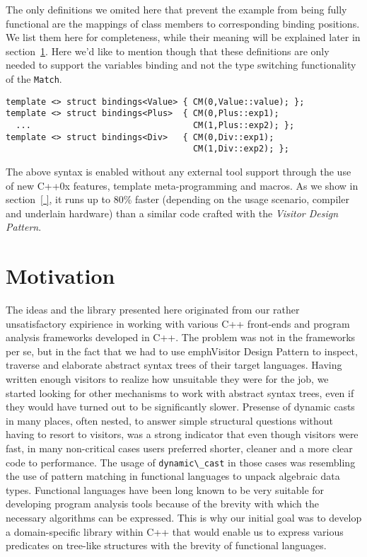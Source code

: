 \documentclass[preprint]{sigplanconf}
\DeclareRobustCommand{\code}[1]{{\lstinline[breaklines=false]{#1}}}
\begin{document}
The only definitions we omited here that prevent the example from being fully 
functional are the mappings of class members to corresponding binding positions. 
We list them here for completeness, while their meaning will be explained later 
in section~\ref{}. Here we'd like to mention though that these definitions are only 
needed to support the variables binding and not the type switching functionality 
of the \code{Match}.

\begin{lstlisting}[keepspaces,columns=flexible]
template <> struct bindings<Value> { CM(0,Value::value); };
template <> struct bindings<Plus>  { CM(0,Plus::exp1); 
  ...                                CM(1,Plus::exp2); };
template <> struct bindings<Div>   { CM(0,Div::exp1); 
                                     CM(1,Div::exp2); };
\end{lstlisting}

The above syntax is enabled without any external tool support through the use
of new C++0x features\cite{C++0x}, template meta-programming and macros. As we 
show in section~\ref{       }, it runs up to 80\% faster (depending on the usage 
scenario, compiler and underlain hardware) than a similar code crafted with the 
\emph{Visitor Design Pattern}.

\section{Motivation} %


The ideas and the library presented here originated from our rather 
unsatisfactory expirience in working with various C++ front-ends and program 
analysis frameworks developed in C++\cite{Pivot09,Phoenix,Clang,Lise}. The 
problem was not in the frameworks per se, but in the fact that we had to use 
emph{Visitor Design Pattern}\cite{DesignPatterns1993} to inspect, traverse and 
elaborate abstract syntax trees of their target languages. Having written enough 
visitors to realize how unsuitable they were for the job, we started looking for 
other mechanisms to work with abstract syntax trees, even if they would have 
turned out to be significantly slower. 
Presense of dynamic casts in many places, often nested, to answer simple 
structural questions without having to resort to visitors, was a strong 
indicator that even though visitors were fast, in many non-critical cases 
users preferred shorter, cleaner and a more clear code to performance.
The usage of \code{dynamic\_cast} in those cases was resembling the use of 
pattern matching in functional languages to unpack algebraic data types. 
Functional languages have been long known to be very suitable for developing 
program analysis tools because of the brevity with which the necessary 
algorithms can be expressed. This is why our initial goal was to develop a 
domain-specific library within C++ that would enable us to express various 
predicates on tree-like structures with the brevity of functional languages.
\end{document}
